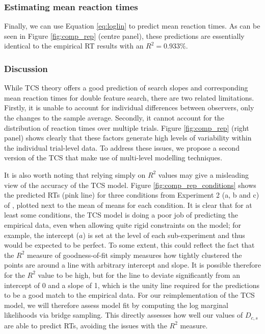 \documentclass[smallextended, natbib]{svjour3}       %
\begin{document}
\subsubsection{Estimating mean reaction times}

Finally, we can use Equation \ref{eq:loglin} to predict mean reaction times. As can be seen in  Figure \ref{fig:comp_rep} (centre panel), these predictions are essentially identical to the empirical RT results with an $R^2 = 0.933\%$. 

\subsubsection{Discussion}

While TCS theory offers a good prediction of search slopes and corresponding mean reaction times for double feature search, there are two related limitations. Firstly, it is unable to account for individual differences between observers, only the changes to the sample average. Secondly, it cannot account for the distribution of reaction times over multiple trials. Figure \ref{fig:comp_rep} (right panel) shows clearly that these factors generate high levels of variability within the individual trial-level data. To address these issues, we propose a second version of the TCS that make use of multi-level modelling techniques.

It is also worth noting that relying simply on $R^2$ values may give a misleading view of the accuracy of the TCS model. Figure \ref{fig:comp_rep_conditions} shows the predicted RTs (pink line) for three conditions from Experiment 2 (a, b and c) of \citep{buetti2019predicting}, plotted next to the mean of means for each condition. It is clear that for at least some conditions, the TCS model is doing a poor job of predicting the empirical data, even when allowing quite rigid constraints on the model; for example, the intercept ($a$) is set at the level of each sub-experiment and thus would be expected to be perfect. To some extent, this could reflect the fact that the $R^2$ measure of goodness-of-fit simply measures how tightly clustered the points are around a line with arbitrary intercept and slope. It is possible therefore for the $R^2$ value to be high, but for the line to deviate significantly from an intercept of 0 and a slope of 1, which is the unity line required for the predictions to be a good match to the empirical data. For our reimplementation of the TCS model, we will therefore assess model fit by computing the log marginal likelihoods via bridge sampling. This directly assesses how well our values of $D_{c,s}$ are able to predict RTs, avoiding the issues with the $R^2$ measure.
\end{document}

